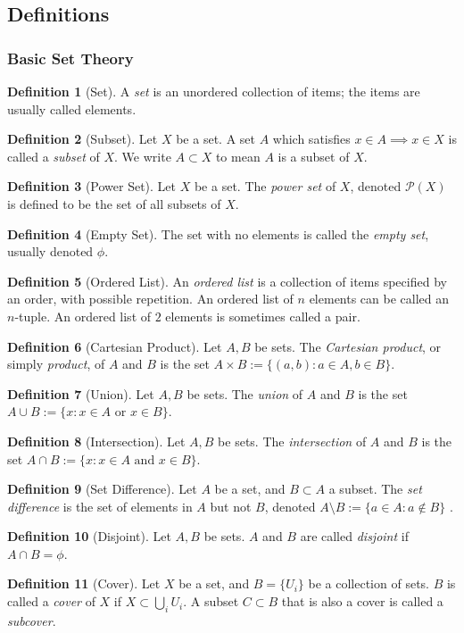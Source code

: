 \documentclass{article}
\theoremstyle{definition}
\newtheorem{definition}{Definition}[subsection]
\theoremstyle{theorem}
\begin{document}
\setcounter{subsection}{-1}
\subsection{Definitions}
\subsubsection*{Basic Set Theory}
\begin{definition}[Set]
    A \textit{set} is an unordered collection of items; the items are usually called elements. 
\end{definition}
\begin{definition}[Subset]
    Let $X$ be a set. A set $A$ which satisfies $x\in A \implies x\in X$ is called a \textit{subset} of $X$. We write $A\subset X$ to mean $A$ is a subset of $X$.
\end{definition}
\begin{definition}[Power Set] Let $X$ be a set. The \textit{power set} of $X$, denoted $\mathcal{P}(X)$ is defined to be the set of all subsets of $X$.
\end{definition}
\begin{definition}[Empty Set]
    The set with no elements is called the \textit{empty set}, usually denoted $\phi$.
\end{definition}
\begin{definition}[Ordered List]
    An \textit{ordered list} is a collection of items specified by an order, with possible repetition. An ordered list of $n$ elements can be called an $n$-tuple. An ordered list of $2$ elements is sometimes called a pair.
\end{definition}
\begin{definition}[Cartesian Product]
    Let $A,B$ be sets. The \textit{Cartesian product}, or simply \textit{product}, of $A$ and $B$ is the set $A\times B := \{(a,b) : a\in A, b\in B\}$.
\end{definition}
\begin{definition}[Union]
    Let $A,B$ be sets. The \textit{union} of $A$ and $B$ is the set $A\cup B:=\{x:x\in A \text{ or } x\in B\}$.
\end{definition}
\begin{definition}[Intersection]
    Let $A,B$ be sets. The \textit{intersection} of $A$ and $B$ is the set $A\cap B:=\{x:x\in A \text{ and } x\in B\}$.
\end{definition}
\begin{definition}[Set Difference]
    Let $A$ be a set, and $B\subset A$ a subset. The \textit{set difference} is the set of elements in $A$ but not $B$, denoted $A \setminus B:=\{a\in A: a \notin B \}$ .
\end{definition}
\begin{definition}[Disjoint]
    Let $A,B$ be sets. $A$ and $B$ are called \textit{disjoint} if $A\cap B=\phi$.
\end{definition}
\begin{definition}[Cover]
    Let $X$ be a set, and $B=\{U_i\}$ be a collection of sets. $B$ is called a \textit{cover} of $X$ if $X\subset \bigcup \limits_{i}U_i$. A subset $C\subset B$ that is also a cover is called a \textit{subcover}.
\end{definition}
\end{document}
